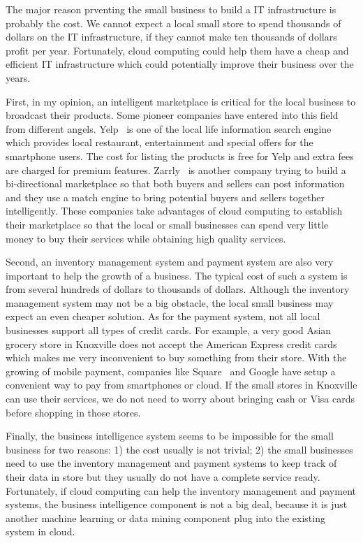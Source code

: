 The major reason prventing the small business to build a IT infrastructure is probably the cost. We cannot expect a local small store to spend thousands of dollars on the IT infrastructure, if they cannot make ten thousands of dollars profit per year. Fortunately, cloud computing could help them have a cheap and efficient IT infrastructure which could potentially improve their business over the years. 

First, in my opinion, an intelligent marketplace is critical for the local business to broadcast their products. Some pioneer companies have entered into this field from different angels. Yelp~\cite{yelp} is one of the local life information search engine which provides local restaurant, entertainment and special offers for the smartphone users. The cost for listing the products is free for Yelp and extra fees are charged for premium features. Zarrly~\cite{zarrly} is another company trying to build a bi-directional marketplace so that both buyers and sellers can post information and they use a match engine to bring potential buyers and sellers together intelligently. These companies take advantages of cloud computing to establish their marketplace so that the local or small businesses can spend very little money to buy their services while obtaining high quality services. 

Second, an inventory management system and payment system are also very important to help the growth of a business. The typical cost of such a system is from several hundreds of dollars to thousands of dollars. Although the inventory management system may not be a big obstacle, the local small business may expect an even cheaper solution. As for the payment system, not all local businesses support all types of credit cards. For example, a very good Asian grocery store in Knoxville does not accept the American Express credit cards which makes me very inconvenient to buy something from their store. With the growing of mobile payment, companies like Square~\cite{square} and Google have setup a convenient way to pay from smartphones or cloud. If the small stores in Knoxville can use their services, we do not need to worry about bringing cash or Visa cards before shopping in those stores.

Finally, the business intelligence system seems to be impossible for the small business for two reasons: 1) the cost usually is not trivial; 2) the small businesses need to use the inventory management and payment systems to keep track of their data in store but they usually do not have a complete service ready. Fortunately, if cloud computing can help the inventory management and payment systems, the business intelligence component is not a big deal, because it is just another machine learning or data mining component plug into the existing system in cloud.

